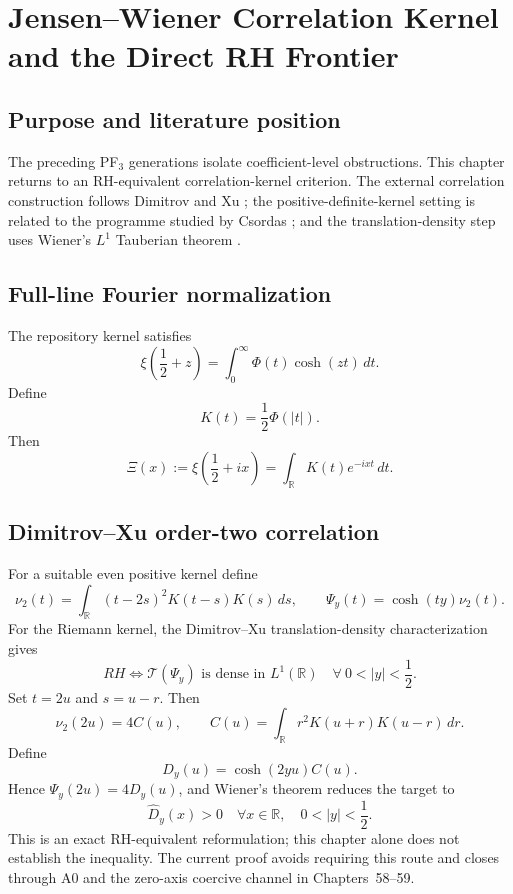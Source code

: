 \chapter{Jensen--Wiener Correlation Kernel and the Direct RH Frontier}
\label{chap:g024-jensen-wiener}


\section{Purpose and literature position}
The preceding PF$_3$ generations isolate coefficient-level obstructions. This chapter returns to an RH-equivalent correlation-kernel criterion. The external correlation construction follows Dimitrov and Xu \citep{dimitrovxu2016}; the positive-definite-kernel setting is related to the programme studied by Csordas \citep{csordas2013positive}; and the translation-density step uses Wiener's $L^1$ Tauberian theorem \citep{wiener1932tauberian}.

\section{Full-line Fourier normalization}
The repository kernel satisfies
\[
\xi\!\left(\frac12+z\right)=\int_0^\infty\Phi(t)\cosh(zt)\,dt.
\]
Define
\[
\boxed{K(t)=\frac12\Phi(|t|).}
\]
Then
\[
\boxed{\Xi(x):=\xi\!\left(\frac12+ix\right)=\int_{\mathbb R}K(t)e^{-ixt}\,dt.}
\]

\section{Dimitrov--Xu order-two correlation}
For a suitable even positive kernel define
\[
\nu_2(t)=\int_{\mathbb R}(t-2s)^2K(t-s)K(s)\,ds,
\qquad
\Psi_y(t)=\cosh(ty)\nu_2(t).
\]
For the Riemann kernel, the Dimitrov--Xu translation-density characterization gives
\[
\boxed{RH\iff\mathcal T(\Psi_y)\text{ is dense in }L^1(\mathbb R)\quad\forall\ 0<|y|<\frac12.}
\]
Set $t=2u$ and $s=u-r$. Then
\[
\boxed{\nu_2(2u)=4C(u)},
\qquad
\boxed{C(u)=\int_{\mathbb R}r^2K(u+r)K(u-r)\,dr}.
\]
Define
\[
\boxed{D_y(u)=\cosh(2yu)C(u).}
\]
Hence $\Psi_y(2u)=4D_y(u)$, and Wiener's theorem reduces the target to
\[
\boxed{\widehat D_y(x)>0\quad\forall x\in\mathbb R,\quad0<|y|<\frac12.}
\]
This is an exact RH-equivalent reformulation; this chapter alone does not establish the inequality. The current proof avoids requiring this route and closes through A0 and the zero-axis coercive channel in Chapters~58--59.

